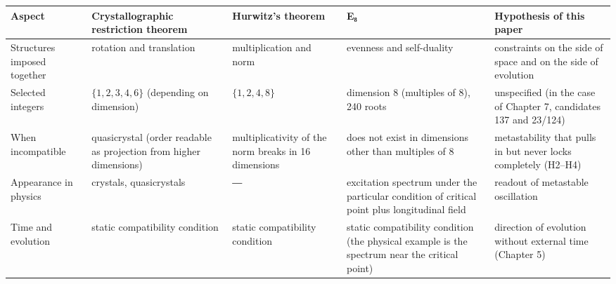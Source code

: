 \documentclass[
  a4paper,
]{article}
\newcounter{none} %
\begin{document}
{\def\LTcaptype{none} %
\begin{longtable}[]{@{}
  >{\raggedright\arraybackslash}p{}
  >{\raggedright\arraybackslash}p{}
  >{\raggedright\arraybackslash}p{}
  >{\raggedright\arraybackslash}p{}
  >{\raggedright\arraybackslash}p{}@{}}
\toprule\noalign{}
\begin{minipage}[b]{\linewidth}\raggedright
Aspect
\end{minipage} & \begin{minipage}[b]{\linewidth}\raggedright
Crystallographic restriction theorem
\end{minipage} & \begin{minipage}[b]{\linewidth}\raggedright
Hurwitz's theorem
\end{minipage} & \begin{minipage}[b]{\linewidth}\raggedright
E₈
\end{minipage} & \begin{minipage}[b]{\linewidth}\raggedright
Hypothesis of this paper
\end{minipage} \\
\midrule\noalign{}
\endhead
\bottomrule\noalign{}
\endlastfoot
Structures imposed together & rotation and translation & multiplication
and norm & evenness and self-duality & constraints on the side of space
and on the side of evolution \\
Selected integers & \(\{1,2,3,4,6\}\) (depending on dimension) &
\(\{1,2,4,8\}\) & dimension 8 (multiples of 8), 240 roots & unspecified
(in the case of Chapter 7, candidates 137 and 23/124) \\
When incompatible & quasicrystal (order readable as projection from
higher dimensions) & multiplicativity of the norm breaks in 16
dimensions & does not exist in dimensions other than multiples of 8 &
metastability that pulls in but never locks completely (H2--H4) \\
Appearance in physics & crystals, quasicrystals & ― & excitation
spectrum under the particular condition of critical point plus
longitudinal field & readout of metastable oscillation \\
Time and evolution & static compatibility condition & static
compatibility condition & static compatibility condition (the physical
example is the spectrum near the critical point) & direction of
evolution without external time (Chapter 5) \\
\end{longtable}
}
\end{document}
